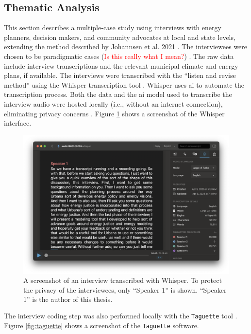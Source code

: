 \begin{enumerate}
\subsection{Thematic Analysis}
This section describes a multiple-case study using interviews with energy
planners, decision makers, and community advocates at local and state levels,
extending the method described by Johannsen et al. 2021
\cite{johannsen_designing_2021}. The interviewees were chosen to be paradigmatic
cases (\textcolor{red}{Is this really what I mean?}) \cite{flyvbjerg_five_2006}.
The raw data include interview transcriptions and the relevant municipal climate
and energy plans, if available. The interviews were transcribed with the
``listen and revise method'' using the Whisper transcription tool
\cite{battaglia_listen_2024}. Whisper uses \ac{ai} to automate the transcription
process. Both the data and the \ac{ai} model used to transcribe the interview
audio were hosted locally (i.e., without an internet connection), eliminating
privacy concerns \cite{battaglia_listen_2024}. Figure \ref{fig:whisper} shows a
screenshot of the Whisper interface. 

\begin{figure}[htbp!]
    \centering
    \includegraphics[width=0.6\columnwidth]{figures/07_interview_chapter/whisper-screenshot.png}
    \caption{A screenshot of an interview transcribed with Whisper. To protect
    the privacy of the interviewees, only ``Speaker 1'' is shown. ``Speaker 1''
    is the author of this thesis.}
    \label{fig:whisper}
\end{figure}


The interview coding step was also performed locally with the \texttt{Taguette}
tool \cite{rampin_taguette_2021}. Figure \ref{fig:taguette} shows a screenshot
of the \texttt{Taguette} software.


\end{enumerate}
